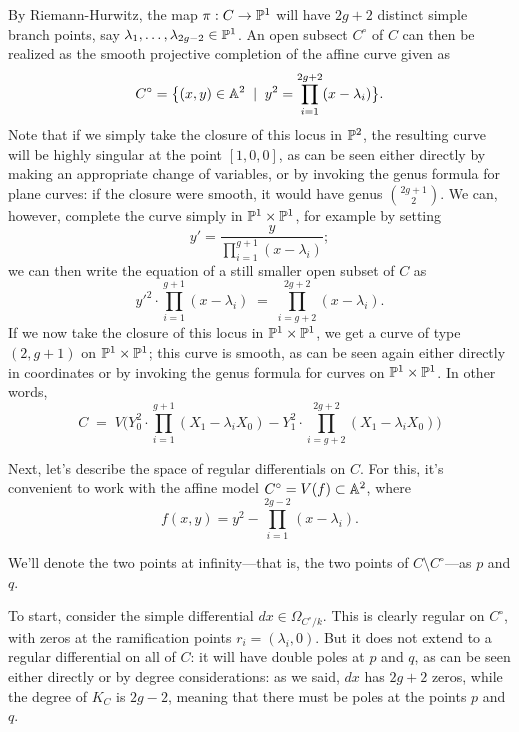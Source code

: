 By Riemann-Hurwitz,  the map $\pi : C \to \PP^1$ will have $2g+2$ distinct simple branch points, say $\lambda_1,\dots,\lambda_{2g-2} \in \PP^1$. An open subsect $C^\circ$ of $C$ can then be realized as the smooth projective completion of the affine curve given as
$$
C^\circ = \big\{ (x,y) \in \AA^2 \; \mid \; y^2 = \prod_{i=1}^{2g+2} (x - \lambda_i) \big\}.
$$ 
  Note that if we simply take the closure of this locus in $\PP^2$, the resulting curve will be highly singular at the point $[1,0,0]$, as can be seen either  directly by making an appropriate change of variables, or by invoking the genus formula for plane curves: if the closure were smooth, it would have genus $\binom{2g+1}{2}$. We can, however, complete the curve simply in $\PP^1 \times \PP^1$, for example by setting 
$$
y' = \frac{y}{\prod_{i=1}^{g+1} (x - \lambda_i)};
$$
we can then write the equation of a still smaller open subset of $C$ as
$$
{y'}^2 \cdot \prod_{i=1}^{g+1} (x - \lambda_i) \; = \; \prod_{i=g+2}^{2g+2} (x - \lambda_i).
$$
If we now take the closure of this locus in $\PP^1 \times \PP^1$, we get a curve of type $(2,g+1)$ on $\PP^1 \times \PP^1$; this curve is smooth, as can be seen again either directly in coordinates or by invoking the genus formula for curves on $\PP^1 \times \PP^1$. In other words,
$$
C \; = \; V\Big(Y_0^2\cdot \prod_{i=1}^{g+1} (X_1 - \lambda_iX_0) - Y_1^2 \cdot \prod_{i=g+2}^{2g+2} (X_1 - \lambda_iX_0) \Big)
$$

Next, let's describe the space of regular differentials on $C$. For this, it's convenient to work with the affine model $C^\circ = V(f) \subset \AA^2$, where
$$
f(x,y) = y^2 - \prod_{i=1}^{2g-2} (x - \lambda_i).
$$

We'll denote the two points at infinity---that is, the two points of $C \setminus C^\circ$---as $p$ and $q$.

To start, consider the simple differential $dx\in \Omega_{C^\circ/k}$. This is clearly regular on $C^\circ$, with zeros at the ramification points $r_i = (\lambda_i, 0)$. But it does not extend to a regular differential on all of $C$: it will have double poles at $p$ and $q$, as can be seen either directly or by degree considerations: as we said, $dx$ has $2g+2$ zeros, while the degree of $K_C$ is $2g-2$, meaning that there must be poles at the points $p$ and $q$.

